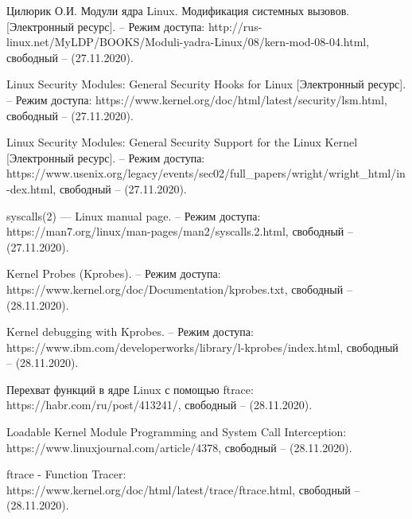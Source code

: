 \documentclass[a4paper,14pt]{article}
\begin{document}
\newpage
\begin{thebibliography}{3}

Цилюрик О.И. Модули ядра Linux. Модификация системных вызовов. [Электронный ресурс]. -- Режим доступа: http://rus-linux.net/MyLDP/BOOKS/Moduli-yadra-Linux/08/kern-mod-08-04.html, свободный -- (27.11.2020).

Linux Security Modules: General Security Hooks for Linux [Электронный ресурс]. -- Режим доступа: https://www.kernel.org/doc/html/latest/security/lsm.html, свободный -- (27.11.2020).

Linux Security Modules:
General Security Support for the Linux Kernel [Электронный ресурс]. -- Режим доступа: https://www.usenix.org/legacy/events/sec02/full\_papers/wright/wright\_html/in-dex.html, свободный -- (27.11.2020).

syscalls(2) — Linux manual page. -- Режим доступа: https://man7.org/linux/man-pages/man2/syscalls.2.html, свободный -- (27.11.2020).

Kernel Probes (Kprobes). -- Режим доступа: https://www.kernel.org/doc/Documentation/kprobes.txt, свободный -- (28.11.2020).

Kernel debugging with Kprobes. -- Режим доступа: https://www.ibm.com/developerworks/library/l-kprobes/index.html, свободный -- (28.11.2020).

Перехват функций в ядре Linux с помощью ftrace: https://habr.com/ru/post/413241/, свободный -- (28.11.2020).

Loadable Kernel Module Programming and System Call Interception: https://www.linuxjournal.com/article/4378, свободный -- (28.11.2020).

ftrace - Function Tracer: https://www.kernel.org/doc/html/latest/trace/ftrace.html, свободный -- (28.11.2020).




\end{thebibliography}
\end{document}
